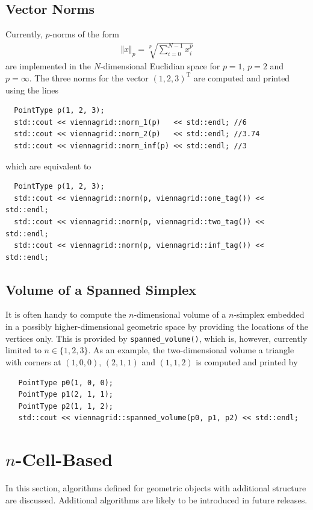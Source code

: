   \subsection{Vector Norms}
 Currently, $p$-norms of the form
  \begin{align}
   \Vert x \Vert_p = \sqrt[p]{\sum_{i=0}^{N-1} x_i^p}
  \end{align}
 are implemented in the $N$-dimensional Euclidian space for $p=1$, $p=2$ and $p=\infty$. The three norms for the vector $(1,2,3)^\mathrm{T}$ are computed and printed using the lines
 \begin{lstlisting}
  PointType p(1, 2, 3);
  std::cout << viennagrid::norm_1(p)   << std::endl; //6
  std::cout << viennagrid::norm_2(p)   << std::endl; //3.74
  std::cout << viennagrid::norm_inf(p) << std::endl; //3
 \end{lstlisting}
which are equivalent to
 \begin{lstlisting}
  PointType p(1, 2, 3);
  std::cout << viennagrid::norm(p, viennagrid::one_tag()) << std::endl;
  std::cout << viennagrid::norm(p, viennagrid::two_tag()) << std::endl;
  std::cout << viennagrid::norm(p, viennagrid::inf_tag()) << std::endl;
 \end{lstlisting}
 

  \subsection{Volume of a Spanned Simplex}
  It is often handy to compute the $n$-dimensional volume of a $n$-simplex embedded in a possibly higher-dimensional geometric space by providing the locations of the vertices only.
  This is provided by \lstinline|spanned_volume()|, which is, however, currently limited to $n \in \{1, 2, 3\}$.
  As an example, the two-dimensional volume a triangle with corners at $(1, 0, 0)$, $(2, 1, 1)$ and $(1, 1, 2)$ is computed and printed by
  \begin{lstlisting}
   PointType p0(1, 0, 0);
   PointType p1(2, 1, 1);
   PointType p2(1, 1, 2);
   std::cout << viennagrid::spanned_volume(p0, p1, p2) << std::endl;
  \end{lstlisting}



\section{$n$-Cell-Based}
In this section, algorithms defined for geometric objects with additional structure are discussed. Additional algorithms are likely to be introduced in future releases.
 
